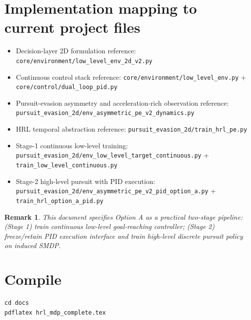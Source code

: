 \documentclass[11pt]{article}
\newtheorem{remark}{Remark}
\begin{document}
\section{Implementation mapping to current project files}
\begin{itemize}
  \item Decision-layer 2D formulation reference: \texttt{core/environment/low\_level\_env\_2d\_v2.py}
  \item Continuous control stack reference: \texttt{core/environment/low\_level\_env.py} + \texttt{core/control/dual\_loop\_pid.py}
  \item Pursuit-evasion asymmetry and acceleration-rich observation reference: \texttt{pursuit\_evasion\_2d/env\_asymmetric\_pe\_v2\_dynamics.py}
  \item HRL temporal abstraction reference: \texttt{pursuit\_evasion\_2d/train\_hrl\_pe.py}
  \item Stage-1 continuous low-level training: \texttt{pursuit\_evasion\_2d/env\_low\_level\_target\_continuous.py} + \texttt{train\_low\_level\_continuous.py}
  \item Stage-2 high-level pursuit with PID execution: \texttt{pursuit\_evasion\_2d/env\_asymmetric\_pe\_v2\_pid\_option\_a.py} + \texttt{train\_hrl\_option\_a\_pid.py}
\end{itemize}

\begin{remark}
This document specifies Option A as a practical two-stage pipeline: (Stage 1) train continuous low-level goal-reaching controller; (Stage 2) freeze/retain PID execution interface and train high-level discrete pursuit policy on induced SMDP.
\end{remark}

\section*{Compile}
\begin{verbatim}
cd docs
pdflatex hrl_mdp_complete.tex
\end{verbatim}
\end{document}
